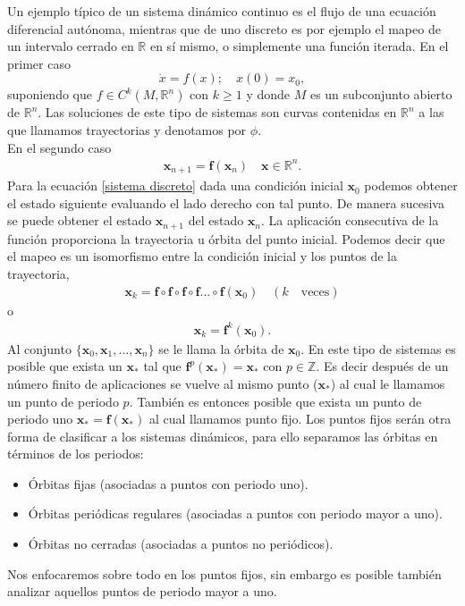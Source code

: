Un ejemplo típico de un sistema dinámico continuo es el flujo de una ecuación diferencial autónoma, mientras que de uno discreto es por ejemplo el mapeo de un intervalo cerrado en $\mathbb{R}$ en sí mismo, o simplemente una función iterada. En el primer caso
\begin{equation}
\dot{x} =  f(x); \quad  
x(0)=x_{0} , \label{ec dif}
\end{equation}
suponiendo que $f \in C^{k}(M,\mathbb{R}^{n})$ con $k \geq 1$ y donde $M$ es un subconjunto abierto de $\mathbb{R}^{n}$. Las soluciones de este tipo de sistemas son curvas contenidas en $\mathbb{R}^{n}$ a las que llamamos trayectorias y denotamos por $\phi$.\\
En el segundo caso  
\begin{eqnarray}
\pmb x_{n+1}= \mathbf{f}(\pmb x_{n}) \quad \pmb x\in \mathbb{R}^{n}. \label{sistema discreto}
\end{eqnarray}
Para la ecuación \eqref{sistema discreto} dada una condición inicial $\pmb x_{0}$ podemos obtener el estado siguiente evaluando el lado derecho con tal punto. De manera sucesiva se puede obtener el estado $\pmb x_{n+1}$ del estado $\pmb x_{n}$. La aplicación consecutiva de la función proporciona la trayectoria u órbita del punto inicial. Podemos decir que el mapeo es un isomorfismo entre la condición inicial y los puntos de la trayectoria,
\begin{eqnarray*}
\pmb x_{k}=\mathbf{f}\circ\mathbf{f}\circ \mathbf{f} \circ \mathbf{f} ... \circ \mathbf{f} (\pmb x_{0})\quad (k \quad \textrm{veces})
\end{eqnarray*}
o
\begin{eqnarray*}
\pmb x_{k} = \mathbf{f}^{k}(\pmb x_{0}).
\end{eqnarray*}
Al conjunto $\lbrace \pmb x_{0},\pmb x_{1},...,\pmb x_{n} \rbrace$ se le llama la órbita de $\pmb x_{0}$.  En este tipo de sistemas es posible que exista un $\pmb x_{*}$ tal que $\mathbf{f}^{p}(\pmb x_{*})=\pmb x_{*}$ con $p \in \mathbb{Z}$. Es decir después de un número finito de aplicaciones se vuelve al mismo punto ($\pmb x_{*}$) al cual le llamamos un punto de periodo $p$. También es entonces posible  que exista un punto de periodo uno $\pmb x_{*}=\mathbf{f}(\pmb x_{*})$ al cual llamamos punto fijo. Los puntos fijos serán otra forma de clasificar a los sistemas dinámicos, para ello separamos las órbitas en términos de los periodos:

\begin{itemize}
\item  Órbitas fijas (asociadas a puntos con periodo uno).
\item Órbitas periódicas regulares (asociadas a puntos con periodo mayor a uno).
\item Órbitas no cerradas (asociadas a puntos no periódicos).
\end{itemize}
Nos enfocaremos sobre todo en los puntos fijos, sin embargo es posible también analizar aquellos puntos de periodo mayor a uno.
